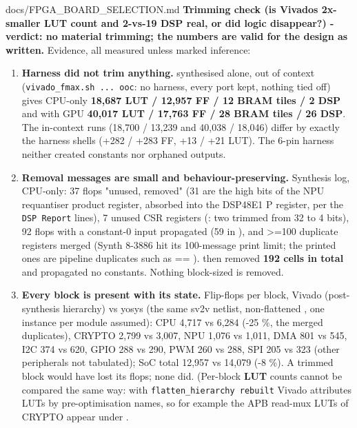 \begin{relocated}{docs/FPGA_BOARD_SELECTION.md}
\textbf{Trimming check (is Vivado\textquotesingle s 2x-smaller LUT count
and 2-vs-19 DSP real, or did logic disappear?) - verdict: no material
trimming; the numbers are valid for the design as written.} Evidence,
all measured unless marked inference:

\begin{enumerate}
\def\labelenumi{\arabic{enumi}.}
\tightlist
\item
  \textbf{Harness did not trim anything.}  synthesised
  alone, out of context
  (\texttt{vivado\_\allowbreak{}fmax.\allowbreak{}sh\ .\allowbreak{}.\allowbreak{}.\allowbreak{}\ ooc}:
  no harness, every port kept, nothing tied off) gives CPU-only
  \textbf{18,687 LUT / 12,957 FF / 12 BRAM tiles / 2 DSP} and with GPU
  \textbf{40,017 LUT / 17,763 FF / 28 BRAM tiles / 26 DSP}. The
  in-context runs (18,700 / 13,239 and 40,038 / 18,046) differ by
  exactly the harness shells (+282 / +283 FF, +13 / +21 LUT). The 6-pin
  harness neither created constants nor orphaned outputs.
\item
  \textbf{Removal messages are small and behaviour-preserving.}
  Synthesis log, CPU-only: 37 flops "unused, removed" (31 are the high
  bits of the NPU requantiser product register, absorbed into the
  DSP48E1 P register, per the \texttt{DSP\ Report} lines), 7 unused CSR
  registers (: two trimmed from 32 to 4 bits), 92
  flops with a constant-0 input propagated (59 in ), and
  \textgreater=100 duplicate registers merged (Synth 8-3886 hit its
  100-message print limit; the printed ones are pipeline duplicates such
  as  == ).
   then removed \textbf{192 cells in total} and
  propagated no constants. Nothing block-sized is removed.
\item
  \textbf{Every block is present with its state.} Flip-flops per block,
  Vivado (post-synthesis hierarchy) vs yosys (the same sv2v netlist,
  non-flattened , one instance per module assumed):
  CPU 4,717 vs 6,284 (-25 \%, the merged duplicates), CRYPTO 2,799 vs
  3,007, NPU 1,076 vs 1,011, DMA 801 vs 545, I2C 374 vs 620, GPIO 288 vs
  290, PWM 260 vs 288, SPI 205 vs 323 (other peripherals not tabulated);
  SoC total 12,957 vs 14,079 (-8 \%). A trimmed block would have lost
  its flops; none did. (Per-block \textbf{LUT} counts cannot be compared
  the same way: with \texttt{flatten\_\allowbreak{}hierarchy\ rebuilt}
  Vivado attributes LUTs by pre-optimisation names, so for example the
  APB read-mux LUTs of CRYPTO appear under .

\end{enumerate}
\end{relocated}
